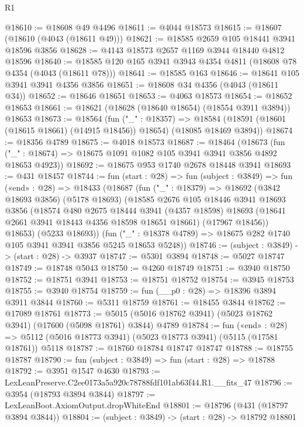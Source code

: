 \begin{lexlean}{R1}
\begin{coremodule}
@18610 := @18608 @49 @4496
@18611 := @4044 @18573
@18615 := @18607 (@18610 (@4043 (@18611 @49)))
@18621 := @18585 @2659 @105 @18441 @3941 @18596 @3856
@18628 := @4143 @18573 @2657 @1169 @3944 @18440 @4812 @18596
@18640 := @18585 @120 @165 @3941 @3943 @4354 @4811 (@18608 @78 @4354 (@4043 (@18611 @78)))
@18641 := @18585 @163
@18646 := @18641 @105 @3941 @3941 @4356 @3856
@18651 := @18608 @34 @4356 (@4043 (@18611 @34))
@18652 := @18646 @18651
@18653 := @4063 @18573
@18654 := @18652 @18653
@18661 := @18621 (@18628 (@18640 @18654) (@18554 @3911 @3894)) @18653
@18673 := @18564
    (fun ("_" : @18357) =>
    @18584 (@18591 (@18601 (@18615 @18661) (@14915 @18456)) @18654) (@18085 @18469 @3894))
@18674 := @18356 @4789
@18675 := @4018 @18573
@18687 := @18464
    (@18673 (fun ("_" : @18674) => @18675 @1091 @1082 @105 @3941 @3941 @3856 @4892 @18653 @4923))
@18692 := @18675 @953 @1740 @2678 @18448 @3941
@18693 := @431 @18457
@18744 := fun (start : @28) =>
  fun (subject : @3849) =>
  fun («end» : @28) =>
  @18433
    (@18687
      (fun ("_" : @18379) =>
      @18692
        (@3842 @18693 @3856)
        (@5178 @18693)
        (@18585
          @2676
          @105
          @18446
          @3941
          @18693
          @3856
          (@18574
            @480
            @2675
            @18444
            @3941
            (@4357 @18598)
            @18693
            (@18641 @2661 @3941 @18443 @4356 @18598 @18651 @18661)
            (@17967 @18456))
          @18653)
        (@5233 @18693))
      (fun ("_" : @18378 @4789) => @18675 @282 @1740 @105 @3941 @3941 @3856 @5245 @18653 @5248))
@18746 := (subject : @3849) -> (start : @28) -> @3937
@18747 := @5301 @3894
@18748 := @5027 @18747
@18749 := @18748 @5043
@18750 := @4260 @18749
@18751 := @3940 @18750
@18752 := @18751 @3941
@18753 := @18751 @18752
@18754 := @3945 @18753
@18755 := @3940 @18754
@18759 := fun (__p0 : @28) => @18396 @3894 @3911 @3844
@18760 := @5311 @18759
@18761 := @18455 @3844
@18762 := @17089 @18761
@18773 := @5015 (@5016 @18762 @3941) (@5023 @18762 @3941) (@17600 (@5098 @18761) @3844) @4789
@18784 := fun («end» : @28) =>
  @5112 (@5016 @18773 @3941) (@5023 @18773 @3941) (@5115 (@17581 @18761)) @5118
@18787 := @18760 @18784 @18747 @18747
@18788 := @18755 @18787
@18790 := fun (subject : @3849) => fun (start : @28) => @18788
@18792 := @3951 @1547 @4630
@18793 := LexLeanPreserve.C2ee0173a5a920c78788fdf101ab63f44.R1.__fits_47
@18796 := @3954 (@18793 @3894 @3844)
@18797 := LexLeanBoot.AxiomOutput.dropWhiteEnd
@18801 := @18796 (@431 (@18797 @3894 @3844))
@18804 := (subject : @3849) -> (start : @28) -> @18792 @18801

\end{coremodule}
\end{lexlean}
